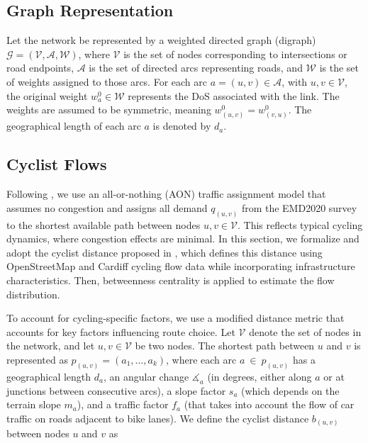 \documentclass[lettersize,journal]{IEEEtran}
\begin{document}
\subsection{Graph Representation}


Let the network be represented by a weighted directed graph (digraph) $\mathcal{G} = (\mathcal{V}, \mathcal{A}, \mathcal{W})$, where $\mathcal{V}$ is the set of nodes corresponding to intersections or road endpoints, $\mathcal{A}$ is the set of directed arcs representing roads, and $\mathcal{W}$ is the set of weights assigned to those arcs. For each arc $a = (u, v) \in \mathcal{A}$, with $u,v \in \mathcal{V}$, the original weight $w_a^{0} \in \mathcal{W}$ represents the DoS associated with the link. The weights are assumed to be symmetric, meaning $w_{(u,v)}^{0} = w_{(v,u)}^{0}$. The geographical length of each arc $a$ is denoted by $d_a$.

\subsection{Cyclist Flows}
\label{section_flows}

Following \cite{mesbah2012bilevel}, we use an all-or-nothing (AON) traffic assignment model that assumes no congestion and assigns all demand $q_{(u,v)}$ from the EMD2020 survey \cite{SMMAG_EMD} to the shortest available path  between nodes $u,v \in \mathcal{V}$. This reflects typical cycling dynamics, where congestion effects are minimal. In this section, we formalize and adopt the cyclist distance proposed in \cite{cooper2017using}, which defines this distance using OpenStreetMap and Cardiff cycling flow data while incorporating infrastructure characteristics. Then, betweenness centrality is applied to estimate the flow distribution.

To account for cycling-specific factors, we use a modified distance metric that accounts for key factors influencing route choice. Let $\mathcal{V}$ denote the set of nodes in the network, and let $u, v \in \mathcal{V}$ be two nodes. The shortest path between $u$ and $v$ is represented as $p_{(u,v)} = (a_{1},\ldots, a_{k})$, where each arc $a~\in~p_{(u,v)}$ has a geographical length $d_{a}$, an angular change $\measuredangle_a$ (in degrees, either along $a$ or at junctions between consecutive arcs), a slope factor $s_{a}$ (which depends on the terrain slope $m_{a}$), and a traffic factor $f_{a}$ (that takes into account the flow of car traffic on roads adjacent to bike lanes). We define the cyclist distance $b_{(u,v)}$ between nodes $u$ and $v$ as
\end{document}
